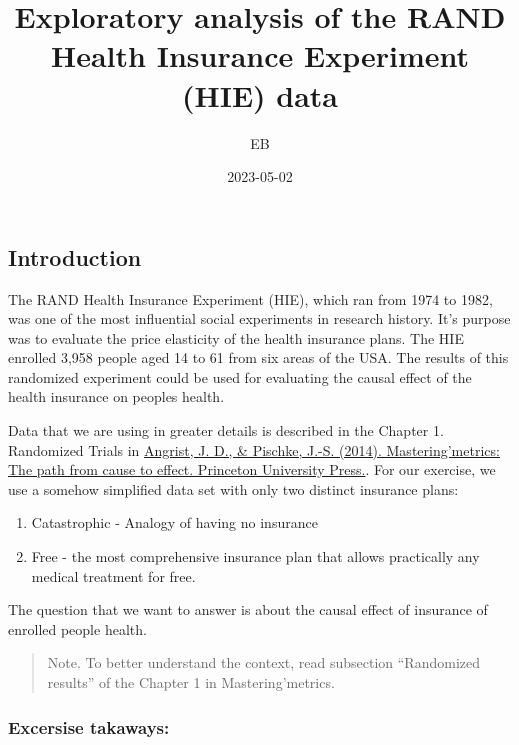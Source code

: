 \documentclass[
  letterpaper,
  DIV=11,
  numbers=noendperiod]{scrartcl}
\title{Exploratory analysis of the RAND Health Insurance Experiment
(HIE) data}
\author{EB}
\date{2023-05-02}
\providecommand{\tightlist}{%
  \setlength{\itemsep}{0pt}\setlength{\parskip}{0pt}}\usepackage{longtable,booktabs,array}
\begin{document}
\maketitle
\ifdefined\Shaded\renewenvironment{Shaded}{\begin{tcolorbox}[breakable, sharp corners, frame hidden, enhanced, borderline west={3pt}{0pt}{shadecolor}, boxrule=0pt, interior hidden]}{\end{tcolorbox}}\fi

\hypertarget{introduction}{%
\subsection{Introduction}\label{introduction}}

The RAND Health Insurance Experiment (HIE), which ran from 1974 to 1982,
was one of the most influential social experiments in research history.
It's purpose was to evaluate the price elasticity of the health
insurance plans. The HIE enrolled 3,958 people aged 14 to 61 from six
areas of the USA. The results of this randomized experiment could be
used for evaluating the causal effect of the health insurance on peoples
health.

Data that we are using in greater details is described in the Chapter 1.
Randomized Trials in
\href{https://hds.hebis.de/ubgi/Record/HEB35797798X}{Angrist, J. D., \&
Pischke, J.-S. (2014). Mastering'metrics: The path from cause to effect.
Princeton University Press.}. For our exercise, we use a somehow
simplified data set with only two distinct insurance plans:

\begin{enumerate}
\def\labelenumi{\arabic{enumi}.}
\tightlist
\item
  Catastrophic - Analogy of having no insurance
\item
  Free - the most comprehensive insurance plan that allows practically
  any medical treatment for free.
\end{enumerate}

The question that we want to answer is about the causal effect of
insurance of enrolled people health.

\begin{quote}
Note. To better understand the context, read subsection ``Randomized
results'' of the Chapter 1 in Mastering'metrics.
\end{quote}

\hypertarget{excersise-takaways}{%
\subsubsection{Excersise takaways:}\label{excersise-takaways}}
\end{document}
